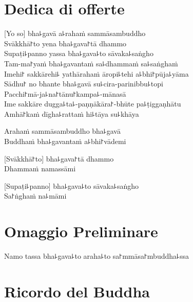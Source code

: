 
\chapter{Dedica di offerte}   %

[Yo so] bha꜕gavā a꜕rahaṁ sammāsambuddho\\
Svākkhā꜓to yena bha꜕gava꜓tā dhammo\\
Supaṭi꜕panno yassa bha꜕gava꜕to sāvaka꜕saṅgho\\
Tam-ma꜓yaṁ bha꜕gavantaṁ sa꜕dhammaṁ sa꜕saṅghaṁ\\
Imehi꜓ sakkārehi꜕ yathārahaṁ āropi꜕tehi a꜕bhi꜓pūja꜕yāma\\
Sādhu꜓ no bhante bha꜕gavā su꜕cira-parinibbu꜕topi\\
Pacchi꜓mā-ja꜕na꜓tānu꜓kampa꜕-mānasā\\
Ime sakkāre dugga꜕ta꜕-paṇṇākāra꜓-bhūte pa꜕ṭiggaṇhātu\\
Amhā꜓kaṁ dīgha꜕rattaṁ hi꜕tāya su꜕khāya

Arahaṁ sammāsambuddho bha꜕gavā\\
Buddhaṁ bha꜕gavantaṁ a꜕bhi꜓vādemi 

[Svākkhā꜓to] bha꜕gava꜓tā dhammo\\
Dhammaṁ namassāmi 

[Supaṭi꜕panno] bha꜕gava꜕to sāvaka꜕saṅgho\\
Sa꜓ṅghaṁ na꜕māmi 

\chapter{Omaggio Preliminare}

\begin{leader}
\end{leader}

Namo tassa bha꜕gava꜕to araha꜕to sa꜓mmāsa꜓mbuddha꜕ssa


\clearpage

\chapter{Ricordo del Buddha}     %

\begin{leader}
\end{leader}

